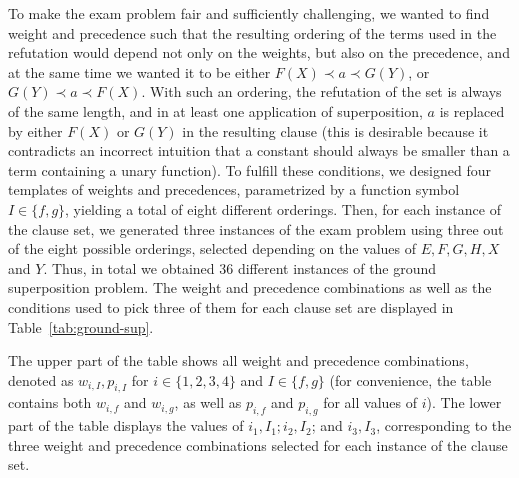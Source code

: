 To make the exam problem fair and sufficiently challenging, we wanted to find
weight and precedence such that the resulting ordering of the terms used
in the refutation would depend not only on the weights, but also on the precedence,
and at the same time we wanted it to be either $F(X) \prec a \prec G(Y)$,
or $G(Y) \prec a \prec F(X)$. With such an ordering,
the refutation of the set is always of the same length, and in
at least one application of superposition, $a$ is replaced by either $F(X)$ or $G(Y)$
in the resulting clause (this is desirable because it contradicts
an incorrect intuition that a constant should always be smaller than a term
containing a unary function).
To fulfill these conditions, we designed four templates of weights and precedences,
parametrized by a function symbol $I \in \{f, g\}$, yielding a total of eight
different orderings.
Then, for each instance of the clause set, we generated three instances of the exam problem
using three out of the eight possible orderings, selected depending on the values
of $E, F, G, H, X$ and $Y$.
Thus, in total we obtained 36 different instances of the ground superposition problem.
The weight and precedence combinations as well as the conditions used to pick
three of them for each clause set are displayed in Table~\ref{tab:ground-sup}.


The upper part of the table shows all weight and precedence combinations,
denoted as $w_{i, I}, p_{i, I}$ for $i \in \{1, 2, 3, 4\}$
and $I \in \{f, g\}$ (for convenience, the table contains both $w_{i, f}$ and $w_{i, g}$, as well as
$p_{i, f}$ and $p_{i, g}$ for all values of $i$).
The lower part of the table displays the values of $i_1, I_1; i_2, I_2$; and $i_3, I_3$,
corresponding to the three weight and precedence combinations selected for
each instance of the clause set.

